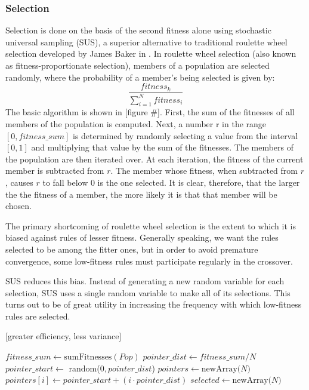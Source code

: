 \documentclass[11pt]{article}
\begin{document}
\subsubsection*{Selection}

Selection is done on the basis of the second fitness alone using stochastic universal sampling (SUS), a superior alternative to traditional roulette wheel selection developed by James Baker in \cite{j_reducing_1987}. In roulette wheel selection (also known as fitness-proportionate selection), members of a population are selected randomly, where the probability of a member’s being selected is given by:
$$ \frac{fitness_k}{\sum_{i=1}^Nfitness_i}$$
The basic algorithm is shown in [figure \#]. First, the sum of the fitnesses of all members of the population is computed. Next, a number r in the range $[0, fitness\_sum]$ is determined by randomly selecting a value from the interval $[0,1]$ and multiplying that value by the sum of the fitnesses. The members of the population are then iterated over. At each iteration, the fitness of the current member is subtracted from $r$. The member whose fitness, when subtracted from $r$, causes $r$ to fall below 0 is the one selected. It is clear, therefore, that the larger the the fitness of a member, the more likely it is that that member will be chosen.

The primary shortcoming of roulette wheel selection is the extent to which it is biased against rules of lesser fitness. Generally speaking, we want the rules selected to be among the fitter ones, but in order to avoid premature convergence, some low-fitness rules must participate regularly in the crossover.

SUS reduces this bias. Instead of generating a new random variable for each selection, SUS uses a single random variable to make all of its selections. This turns out to be of great utility in increasing the frequency with which low-fitness rules are selected.

[greater efficiency, less variance]

\begin{algorithm}
\begin{algorithmic}
\State $fitness\_sum \gets \text{sumFitnesses}(Pop)$
\State $pointer\_dist \gets fitness\_sum/N$
\State $pointer\_start \gets$ random($0,pointer\_dist$)
\State $pointers \gets \text{newArray($N$)}$
\State $pointers[i] \gets pointer\_start + (i \cdot pointer\_dist)$
\EndFor
\State $selected \gets \text{newArray($N$)}$
\EndFor
\EndFunction
\end{algorithmic}
\end{algorithm}
\end{document}
